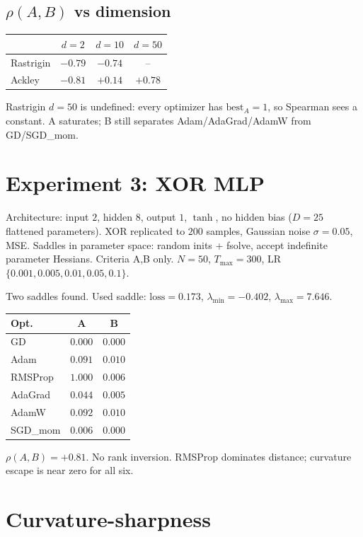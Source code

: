 \documentclass[11pt]{article}
\begin{document}
\subsection{$\rho(A,B)$ vs dimension}

\begin{center}
\begin{tabular}{lccc}
\toprule
 & $d=2$ & $d=10$ & $d=50$ \\
\midrule
Rastrigin & $-0.79$ & $-0.74$ & -- \\
Ackley    & $-0.81$ & $+0.14$ & $+0.78$ \\
\bottomrule
\end{tabular}
\end{center}
Rastrigin $d=50$ is undefined: every optimizer has $\mathrm{best}_A=1$, so
Spearman sees a constant. A saturates; B still separates
Adam/AdaGrad/AdamW from GD/SGD\_mom.

\section{Experiment 3: XOR MLP}

Architecture: input $2$, hidden $8$, output $1$, $\tanh$, no hidden bias
($D=25$ flattened parameters). XOR replicated to $200$ samples, Gaussian
noise $\sigma=0.05$, MSE. Saddles in parameter space: random inits + fsolve,
accept indefinite parameter Hessians. Criteria A,B only. $N=50$,
$T_{\max}=300$, LR $\{0.001,0.005,0.01,0.05,0.1\}$.

Two saddles found. Used saddle: $\mathrm{loss}=0.173$,
$\lambda_{\min}=-0.402$, $\lambda_{\max}=7.646$.

\begin{center}
\begin{tabular}{lcc}
\toprule
Opt. & A & B \\
\midrule
GD      & $0.000$ & $0.000$ \\
Adam    & $0.091$ & $0.010$ \\
RMSProp & $1.000$ & $0.006$ \\
AdaGrad & $0.044$ & $0.005$ \\
AdamW   & $0.092$ & $0.010$ \\
SGD\_mom& $0.006$ & $0.000$ \\
\bottomrule
\end{tabular}
\end{center}
$\rho(A,B)=+0.81$. No rank inversion. RMSProp dominates distance; curvature
escape is near zero for all six.

\section{Curvature-sharpness}
\end{document}
